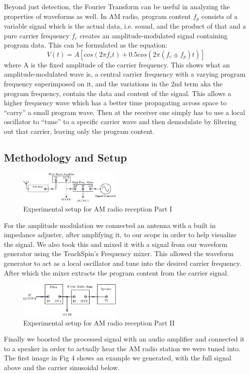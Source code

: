 \documentclass[prl,twocolumn,superscriptaddress,floatfix]{revtex4}
\begin{document}
Beyond just detection, the Fourier Transform can be useful in analyzing the properties of waveforms as well.
In AM radio, program content $f_{p}$ consists of a variable signal which is the actual data, i.e. sound, and the product of that and a pure carrier frequency $f_{c}$ creates an amplitude-modulated signal containing program data.
This can be formulated as the equation:
\begin{equation}
    V(t) = A[cos(2\pi f_{c}t)+0.5cos(2\pi(f_{c} \pm f_{p})t)]
\end{equation}
where A is the fixed amplitude of the carrier frequency.
This shows what an amplitude-modulated wave is, a central carrier frequency with a varying program frequency superimposed on it, and the variations in the 2nd term aka the program frequency, contain the data and content of the signal.
This allows a higher frequency wave which has a better time propagating across space to ``carry'' a small program wave.
Then at the receiver one simply has to use a local oscillator to ``tune'' to a specific carrier wave and then demodulate by filtering out that carrier, leaving only the program content.
\subsection{Methodology and Setup}
\begin{figure}[H]
    \includegraphics[width=0.45\textwidth]{exp2_1.pdf}
    \caption{Experimental setup for AM radio reception Part I}
    \label{fig:AM1}
\end{figure}
For the amplitude modulation we connected an antenna with a built in impedance adjuster, after amplifying it, to our scope in order to help visualize the signal. We also took this and mixed it with a signal from our waveform generator using the TeachSpin's Frequency mixer. This allowed the waveform generator to act as a local oscillator and tune into the desired carrier frequency. After which the mixer extracts the program content from the carrier signal. 
\begin{figure}[H]
    \includegraphics[width=0.45\textwidth]{exp2_2.pdf}
    \caption{Experimental setup for AM radio reception Part II}
    \label{fig:AM2}
\end{figure}
Finally we boosted the processed signal with an audio amplifier and connected it to a speaker in order to actually hear the AM radio station we were tuned into.
The first image in Fig 4 shows an example we generated, with the full signal above and the carrier sinusoidal below.
\end{document}
